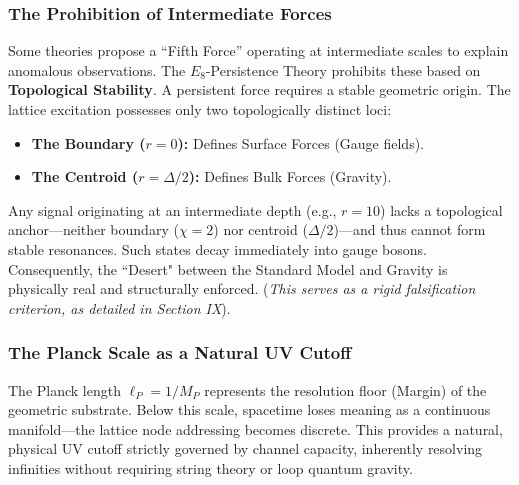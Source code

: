 \subsubsection{The Prohibition of Intermediate Forces}
Some theories propose a ``Fifth Force'' operating at intermediate scales to explain anomalous observations. The $E_8$-Persistence Theory prohibits these based on \textbf{Topological Stability}. A persistent force requires a stable geometric origin. The lattice excitation possesses only two topologically distinct loci:
\begin{itemize}
    \item \textbf{The Boundary ($r=0$):} Defines Surface Forces (Gauge fields).
    \item \textbf{The Centroid ($r=\Delta/2$):} Defines Bulk Forces (Gravity).
\end{itemize}
Any signal originating at an intermediate depth (e.g., $r=10$) lacks a topological anchor—neither boundary ($\chi=2$) nor centroid ($\Delta/2$)—and thus cannot form stable resonances. Such states decay immediately into gauge bosons. Consequently, the ``Desert" between the Standard Model and Gravity is physically real and structurally enforced. (\textit{This serves as a rigid falsification criterion, as detailed in Section IX}).

\subsubsection{The Planck Scale as a Natural UV Cutoff}
The Planck length $\ell_P = 1/M_P$ represents the resolution floor (Margin) of the geometric substrate. Below this scale, spacetime loses meaning as a continuous manifold—the lattice node addressing becomes discrete. This provides a natural, physical UV cutoff strictly governed by channel capacity, inherently resolving infinities without requiring string theory or loop quantum gravity.